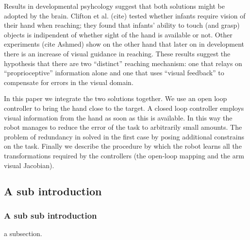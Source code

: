 Results in developmental psyhcology suggest that both solutions might be
adopted by the brain. Clifton et al. (cite) tested whether infants require 
vision of their hand when reaching; they found that infants' ability to touch 
(and grasp) objects is indipendent of whether sight of the hand is available
or not. Other experiments (cite Ashmed) show on the other hand that later on 
in development there is an increase of visual guidance in reaching. These
results suggest the hypothesis that there are two ``distinct'' reaching 
mechanism: one that relays on ``proprioceptive'' information alone and 
one that uses ``visual feedback'' to compensate for errors in the visual domain.

In this paper we integrate the two solutions together. We use an open loop
controller to bring the hand close to the target. A closed loop controller 
employs visual information from the hand as soon as this is available. In this
way the robot manages to reduce the error of the task to arbitrarily small 
amounts. The problem of redundancy in solved in the first case by posing additional 
constrains on the task. Finally we describe the procedure by which the robot learns all the 
transformations required by the controllers (the open-loop mapping and the arm 
visual Jacobian).


\subsection{A sub introduction}
\subsubsection{A sub sub introduction}
a subsection.


